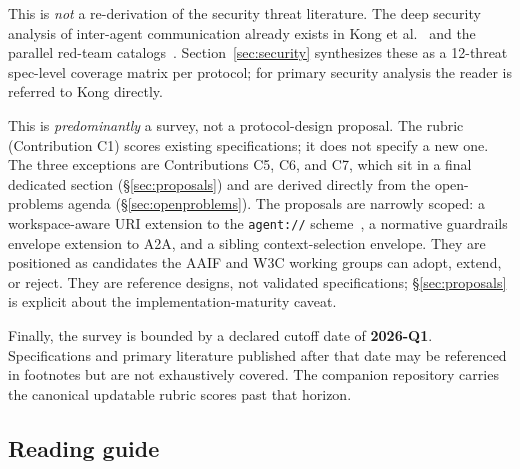This is \emph{not} a re-derivation of the security threat
literature. The deep security analysis of inter-agent communication
already exists in Kong et al.~\cite{kong2025communication} and the
parallel red-team
catalogs~\cite{a2asecbench, zhan2024injecagent, a2a_weaknesses}.
Section~\ref{sec:security} synthesizes these as a 12-threat
spec-level coverage matrix per protocol; for primary security
analysis the reader is referred to Kong directly.

This is \emph{predominantly} a survey, not a protocol-design
proposal. The rubric (Contribution C1) scores existing
specifications; it does not specify a new one. The three
exceptions are Contributions C5, C6, and C7, which sit in
a final dedicated section (\S\ref{sec:proposals}) and are
derived directly from the open-problems agenda
(\S\ref{sec:openproblems}). The proposals are narrowly
scoped: a workspace-aware URI extension to the
\texttt{agent://} scheme~\cite{agent_uri_scheme}, a
normative guardrails envelope extension to A2A, and a
sibling context-selection envelope. They are
positioned as candidates the AAIF and W3C working groups
can adopt, extend, or reject. They are reference designs,
not validated specifications; \S\ref{sec:proposals} is
explicit about the implementation-maturity caveat.

Finally, the survey is bounded by a declared cutoff date of
\textbf{2026-Q1}. Specifications and primary literature published
after that date may be referenced in footnotes but are not
exhaustively covered. The companion repository carries the
canonical updatable rubric scores past that horizon.

\subsection{Reading guide}
\label{sec:intro:guide}

